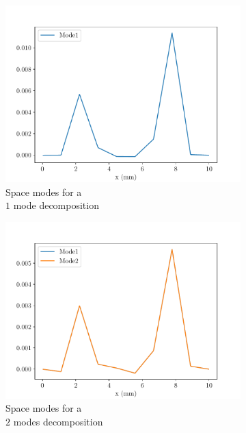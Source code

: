 \begin{figure}
    \begin{subfigure}{0.3\linewidth}
        \centering
        \includegraphics[width=\linewidth]{Figures/Space_modes1.pdf}
        \caption{Space modes for a \\$1$ mode decomposition}
    \end{subfigure}
    \begin{subfigure}{0.3\linewidth}
        \centering
        \includegraphics[width=\linewidth]{Figures/Space_modes2.pdf}
        \caption{Space modes for a \\$2$ modes decomposition}
    \end{subfigure}
    \begin{subfigure}{0.3\linewidth}

\end{subfigure}
\end{figure}
